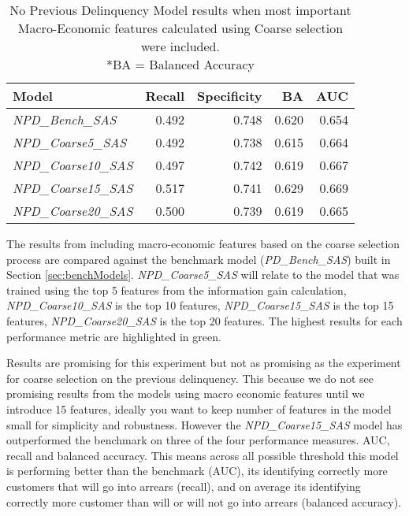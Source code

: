 \begin{table}[H]
	\centering
	\small
	\begin{tabular}{l r r r r}
		\hline
		\textbf{Model} & \textbf{Recall} & \textbf{Specificity} & \textbf{BA} & \textbf{AUC}  \\ \hline
		\textit{NPD\_Bench\_SAS} & 0.492 & \cellcolor{green!25}0.748 & 0.620 & 0.654 \\ \hline
		\textit{NPD\_Coarse5\_SAS}  & 0.492 & 0.738 & 0.615 & 0.664   \\ 
		\textit{NPD\_Coarse10\_SAS} & 0.497 & 0.742 & 0.619 & 0.667  \\ 
		\textit{NPD\_Coarse15\_SAS} & \cellcolor{green!25}0.517 & 0.741 & \cellcolor{green!25}0.629 & \cellcolor{green!25}0.669  \\
		\textit{NPD\_Coarse20\_SAS} & 0.500 & 0.739 & 0.619 & 0.665  \\\hline 
	\end{tabular}
	\caption{{No Previous Delinquency Model results when most important\\
			Macro-Economic features calculated using Coarse selection were included.
			\\ *BA = Balanced Accuracy}}
	\label{table:CoarseNPDModelResults}
\end{table}
The results from including macro-economic features based on the coarse selection process are compared against the benchmark model (\textit{PD\_Bench\_SAS}) built in Section \ref{sec:benchModels}. \textit{NPD\_Coarse5\_SAS} will relate to the model that was trained using the top 5 features from the information gain calculation, \textit{NPD\_Coarse10\_SAS} is the top 10 features, \textit{NPD\_Coarse15\_SAS} is the top 15 features, \textit{NPD\_Coarse20\_SAS} is the top 20 features. The highest results for each performance metric are highlighted in green.

Results are promising for this experiment but not as promising as the experiment for coarse selection on the previous delinquency. This because we do not see promising results from the models using macro economic features until we introduce 15 features, ideally you want to keep number of features in the model small for simplicity and robustness. However the \textit{NPD\_Coarse15\_SAS} model has outperformed the benchmark on three of the four performance measures. AUC, recall and balanced accuracy. This means across all possible threshold this model is performing better than the benchmark (AUC), its identifying correctly more customers that will go into arrears (recall), and on average its identifying correctly more customer than will or will not go into arrears (balanced accuracy). 

